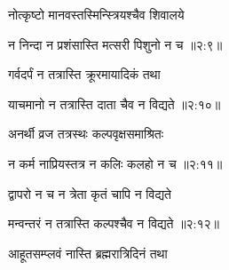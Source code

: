 {\devanagarifont नोत्कृष्टो मानवस्तस्मिन्स्त्रियश्चैव शिवालये \thinspace{\dandab} \dontdisplaylinenum }%


{\devanagarifont न निन्दा न प्रशंसास्ति मत्सरी पिशुनो न च {॥२:९॥} \veg\dontdisplaylinenum }%

{\devanagarifont गर्वदर्पं न तत्रास्ति क्रूरमायादिकं तथा \thinspace{\dandab} \dontdisplaylinenum }%
 

{\devanagarifont याचमानो न तत्रास्ति दाता चैव न विद्यते {॥२:१०॥} \veg\dontdisplaylinenum }%

{\devanagarifont अनर्थी व्रज तत्रस्थः कल्पवृक्षसमाश्रितः \thinspace{\dandab} \dontdisplaylinenum }%


{\devanagarifont न कर्म नाप्रियस्तत्र न कलिः कलहो न च {॥२:११॥} \veg\dontdisplaylinenum }%

{\devanagarifont द्वापरो न च न त्रेता कृतं चापि न विद्यते \thinspace{\dandab} \dontdisplaylinenum }%


{\devanagarifont मन्वन्तरं न तत्रास्ति कल्पश्चैव न विद्यते {॥२:१२॥} \veg\dontdisplaylinenum }%

{\devanagarifont आहूतसम्प्लवं नास्ति ब्रह्मरात्रिदिनं तथा \thinspace{\dandab} \dontdisplaylinenum }%
     \var{{\devanagarifont \numemph\va आहूत॰\lem \mssCaCbCc\msNa\msNc\  आभूत॰ \Ed}}%

